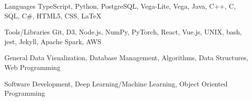 

\begin{cvskills}

  \cvskill
    {Languages} %
    {TypeScript, Python, PostgreSQL, Vega-Lite, Vega, Java, C++, C, SQL, C\#, HTML5, CSS, LaTeX} %

  \cvskill
    {Tools/Libraries} %
    {Git, D3, Node.js, NumPy, PyTorch, React, Vue.js, UNIX, bash, jest, Jekyll, Apache Spark, AWS} %

  \cvskill
    {General} %
    {Data Visualization, Database Management, Algorithms, Data Structures, Web Programming} %

  \cvskill
    {} %
    {Software Development, Deep Learning/Machine Learning, Object Oriented Programming} %

\end{cvskills}